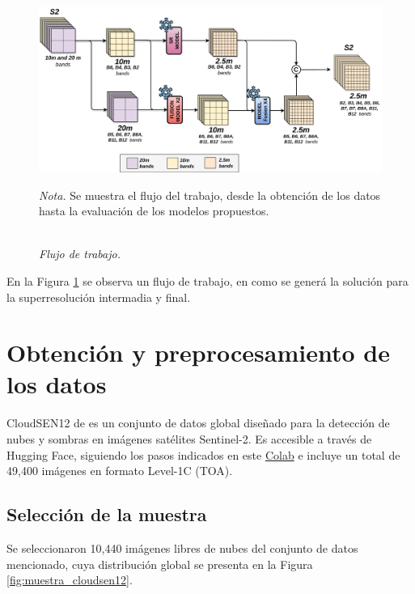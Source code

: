    \begin{figure}[H] 
        \caption{\doublespacing \\ \textit{Flujo de trabajo.}} 
        \centering
        \includegraphics[width=1\linewidth]{images/cap3/modelo.png}
        \begin{justify}
            \textit{Nota.} Se muestra el flujo del trabajo, desde la obtención de los datos hasta la evaluación de los modelos propuestos.
        \end{justify}                    
        \label{fig:modelo}
    \end{figure}

    En la Figura \ref{fig:modelo} se observa un flujo de trabajo, en como se generá la solución para la superresolución intermadia y final.





\chapter{Obtención y preprocesamiento de los datos}
    
CloudSEN12 de \textcite{aybar2024cloudsen12+} es un conjunto de datos global diseñado para la detección de nubes y sombras en imágenes satélites Sentinel-2. Es accesible a través de Hugging Face, siguiendo los pasos indicados en este \href{https://colab.research.google.com/drive/10QqUk-4pP6lZHj1I9GfMpzDY-cd0Fdza?usp=sharing}{Colab} e incluye un total de 49,400 imágenes en formato Level-1C (TOA).
        

\section{Selección de la muestra}

    Se seleccionaron 10,440 imágenes libres de nubes del conjunto de datos mencionado, cuya distribución global se presenta en la Figura \ref{fig:muestra_cloudsen12}.

